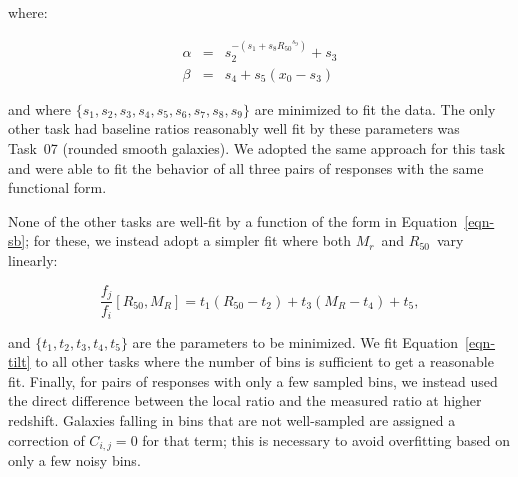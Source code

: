 \documentclass[useAMS,usenatbib]{mn2e}
\newcommand{\mr}{$M_r$}
\newcommand{\rfifty}{$R_{50}$}
\begin{document}
\noindent where:

\begin{eqnarray}
\alpha &=& s_2^{-\left(s_1 + s_8{R_{50}}^{s_9}\right)} + s_3 \\
\beta  &=& s_4 + s_5(x_0 - s_3)
\end{eqnarray}

\noindent and where $\{s_1,s_2,s_3,s_4,s_5,s_6,s_7,s_8,s_9\}$ are minimized to fit the data. The only other task had baseline ratios reasonably well fit by these parameters was Task~07 (rounded smooth galaxies). We adopted the same approach for this task and were able to fit the behavior of all three pairs of responses with the same functional form. 

None of the other tasks are well-fit by a function of the form in Equation~\ref{eqn-sb}; for these, we instead adopt a simpler fit where both \mr~and \rfifty~vary linearly:

\begin{equation}
\frac{f_j}{f_i}[R_{50},M_R] = t_1(R_{50} - t_2) + t_3(M_R - t_4) + t_5,
\label{eqn-tilt}
\end{equation}

\noindent and $\{t_1,t_2,t_3,t_4,t_5\}$ are the parameters to be minimized. We fit Equation~\ref{eqn-tilt} to all other tasks where the number of bins is sufficient to get a reasonable fit. Finally, for pairs of responses with only a few sampled bins, we instead used the direct difference between the local ratio and the measured ratio at higher redshift. Galaxies falling in bins that are not well-sampled are assigned a correction of $C_{i,j}=0$ for that term; this is necessary to avoid overfitting based on only a few noisy bins. 


\end{document}
